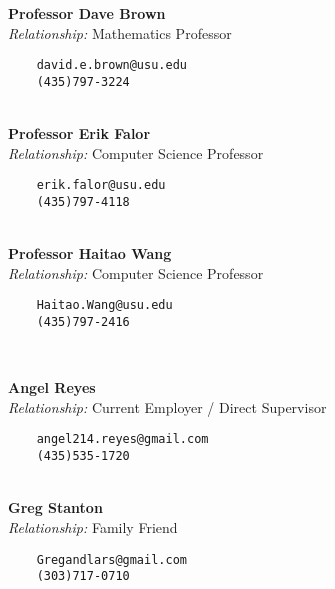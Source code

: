 \documentclass[letterpaper]{article}
\begin{document}
\begin{minipage}[t]{0.5\textwidth}

\noindent\textbf{Professor Dave Brown}\\
\textit{Relationship: } Mathematics Professor
\begin{lstlisting}
	david.e.brown@usu.edu
	(435)797-3224
\end{lstlisting}

\hdashrule[0.5ex]{4cm}{1pt}{1pt}\\

\noindent\textbf{Professor Erik Falor}\\
\textit{Relationship: } Computer Science Professor
\begin{lstlisting}
	erik.falor@usu.edu
	(435)797-4118
\end{lstlisting}

\hdashrule[0.5ex]{4cm}{1pt}{1pt}\\

\noindent\textbf{Professor Haitao Wang}\\
\textit{Relationship: } Computer Science Professor
\begin{lstlisting}
	Haitao.Wang@usu.edu
	(435)797-2416
\end{lstlisting}

\hdashrule[0.5ex]{4cm}{1pt}{1pt}\\

\end{minipage}

\begin{minipage}[t]{0.5\textwidth}

\noindent\textbf{Angel Reyes}\\
\textit{Relationship: } Current Employer / Direct Supervisor
\begin{lstlisting}
	angel214.reyes@gmail.com
	(435)535-1720
\end{lstlisting}

\hdashrule[0.5ex]{4cm}{1pt}{1pt}\\

\noindent\textbf{Greg Stanton}\\
\textit{Relationship: } Family Friend
\begin{lstlisting}
	Gregandlars@gmail.com
	(303)717-0710
\end{lstlisting}

\hdashrule[0.5ex]{4cm}{1pt}{1pt}\\

\end{minipage}
\end{document}
